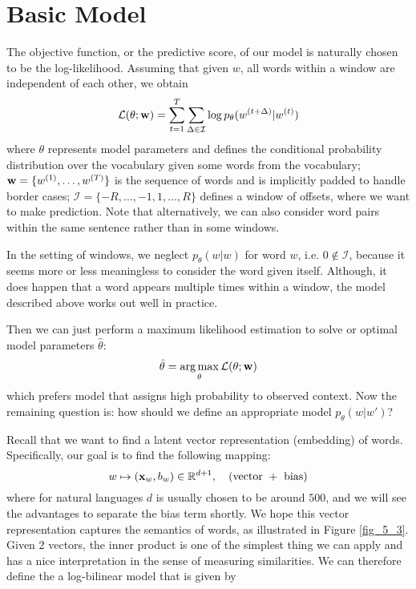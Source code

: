 \documentclass[../book-template.tex]{subfiles}
\begin{document}
\section{Basic Model}
The objective function, or the predictive score, of our model is naturally chosen to be the log-likelihood. Assuming that given $w$, all words within a window are independent of each other, we obtain
\begin{equation}\label{eq_5_log_l}
	\mathcal{L}(\theta;{\bf w})=\sum_{t=1}^{T}\sum_{\Delta \in \mathcal{I}}\log p_{\theta}(w^{(t+\Delta)}|w^{(t)})
\end{equation} 
where $\theta$ represents model parameters and defines the conditional probability distribution over the vocabulary given some words from the vocabulary; ${\bf w}=\{w^{(1)},\dots,w^{(T)}\}$ is the sequence of words and is implicitly padded to handle border cases; $\mathcal{I}=\{-R,\dots,-1,1,\dots,R\}$ defines a window of offsets, where we want to make prediction. Note that alternatively, we can also consider word pairs within the same sentence rather than in some windows.
\begin{remark}
	In the setting of windows, we neglect $p_{\theta}(w|w)$ for word $w$, i.e. $0\notin \mathcal{I}$, because it seems more or less meaningless to consider the word given itself. Although, it does happen that a word appears multiple times within a window, the model described above works out well in practice.
\end{remark}
\par Then we can just perform a maximum likelihood estimation to solve or optimal model parameters $\hat{\theta}$:
\begin{equation*}
	\hat{\theta} = \mathop{\arg\max}_{\theta}\mathcal{L}(\theta;{\bf w})
\end{equation*}
which prefers model that assigns high probability to observed context. Now the remaining question is: how should we define an appropriate model $p_{\theta}(w|w')$? 
\par Recall that we want to find a latent vector representation (embedding) of words. Specifically, our goal is to find the following mapping:
\begin{equation*}
	w \mapsto ({\bf x}_w,b_w)\in \mathbb{R}^{d+1},\quad (\text{vector }+\text{ bias})
\end{equation*}
where for natural languages $d$ is usually chosen to be around $500$, and we will see the advantages to separate the bias term shortly. We hope this vector representation captures the semantics of words, as illustrated in Figure \ref{fig_5_3}. Given 2 vectors, the inner product is one of the simplest thing we can apply and has a nice interpretation in the sense of measuring similarities. We can therefore define the a log-bilinear model that is given by
\end{document}
